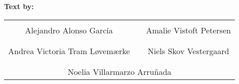 \textbf{Text by:}\\
\vspace{-5pt}
\begin{table}[H]
	\centering
		\begin{tabular}{c c c}
			\underline{\phantom{JAERJAERJAERJJJJJJJJAERGO}} & \phantom{cookies} & \underline{\phantom{JAERJAERJAERJJJJJJJJAERGO}} \\
			Alejandro Alonso García			& \phantom{cookies} & Amalie Vistoft Petersen		\\
			&&\\
			\underline{\phantom{JAERJAERJAERJJJJJJJJAERGO}} & \phantom{cookies} & \underline{\phantom{JAERJAERJAERJJJJJJJJAERGO}} \\
			Andrea Victoria Tram Løvemærke			& \phantom{cookies} & Niels Skov Vestergaard		\\
			&&\\
	    \multicolumn{3}{c}{\underline{\phantom{JAERJAERJAERJJJJJJJJAERGO}}}\\
	    \multicolumn{3}{c}{Noelia Villarmarzo Arruñada}\\				
		\end{tabular}
\end{table}

\pagebreak
\restoregeometry